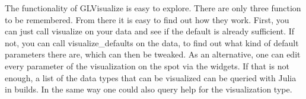 The functionality of GLVisualize is easy to explore. There are only three function to be remembered. From there it is easy to find out how they work. First, you can just call visualize on your data and see if the default is already sufficient. If not, you can call visualize_defaults on the data, to find out what kind of default parameters there are, which can then be tweaked. As an alternative, one can edit every parameter of the visualization on the spot via the widgets. 
If that is not enough, a list of the data types that can be visualized can be queried with Julia in builds. 
In the same way one could also query help for the visualization type.



